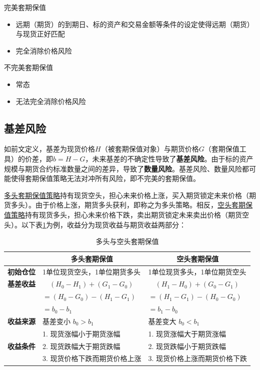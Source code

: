 \documentclass[11pt]{article}
\begin{document}
完美套期保值
\begin{itemize}
    \item 远期（期货）的到期日、标的资产和交易金额等条件的设定使得远期（期货）与现货正好匹配
    \item 完全消除价格风险
\end{itemize}

不完美套期保值
\begin{itemize}
    \item 常态
    \item 无法完全消除价格风险
\end{itemize}

\subsection{基差风险}

如前文定义，基差为现货价格$H$（被套期保值对象）与期货价格$G$（套期保值工具）的价差，即$b = H - G$，未来基差的不确定性导致了\textbf{基差风险}。由于标的资产规模与期货合约标准数量之间的差异，导致了\textbf{数量风险}。基差风险、数量风险都可能使得套期保值策略无法对冲所有风险，即不完美的套期保值。

\uline{多头套期保值策略}持有现货空头，担心未来价格上涨，买入期货锁定未来价格（期货多头）。由于价格上涨，期货多头获利，即称之为多头策略。相反，\uline{空头套期保值策略}持有现货多头，担心未来价格下跌，卖出期货锁定未来卖出价格（期货空头）。以下表\ref{tab:basis-risk}为例，收益分为现货收益与期货收益两部分：

\begin{table}[H]
\centering
\begin{tabular}{@{}cll@{}}
\toprule
\multicolumn{1}{l}{}           
& \multicolumn{1}{c}{\textbf{多头套期保值}} & \multicolumn{1}{c}{\textbf{空头套期保值}} \\
\midrule
\textbf{初始仓位} & 1单位现货空头，1单位期货多头 & 1单位现货多头，1单位期货空头 \\
\textbf{基差收益} &$\quad(H_0 - H_1) + (G_1 - G_0)$ & $\quad(H_1 - H_0) + (G_0 - G_1)$ \\
& $=(H_0 - G_0) - (H_1 - G_1)$ & $=(H_1 - G_1) - (H_0 - G_0)$ \\
& $=b_0 - b_1$ & $=b_1 - b_0$ \\
\textbf{收益来源} & 基差变小 $b_0>b_1$ & 基差变大 $b_0<b_1$\\
\multirow{3}{*}{\textbf{收益条件}} & 1. 现货涨幅小于期货涨幅 & 1. 现货涨幅大于期货涨幅 \\
& 2. 现货跌幅大于期货跌幅 & 2. 现货跌幅小于期货跌幅 \\ 
& 3. 现货价格下跌而期货价格上涨 & 3. 现货价格上涨而期货价格下跌 \\
\bottomrule
\end{tabular}
\caption{多头与空头套期保值}
\label{tab:basis-risk}
\end{table}
\end{document}

